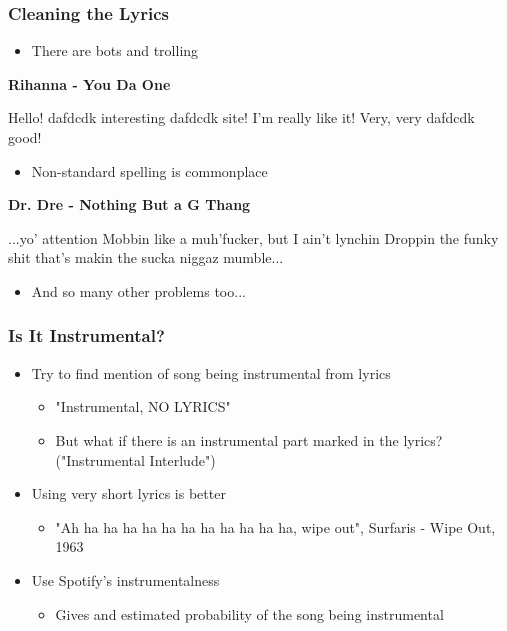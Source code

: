 \documentclass[10pt]{beamer}
\begin{document}
\begin{frame}
\frametitle{Cleaning the Lyrics}

\begin{itemize}
    \item There are bots and trolling
\end{itemize}

\medskip

\textbf{Rihanna - You Da One}

Hello! dafdcdk interesting dafdcdk site! I'm really like it! Very, very dafdcdk good!

\pause

\bigskip

\begin{itemize}
    \item Non-standard spelling is commonplace
\end{itemize}

\medskip

\textbf{Dr. Dre - Nothing But a G Thang}

...yo' attention Mobbin like a muh'fucker, but I ain't lynchin Droppin the funky shit that's makin the sucka niggaz mumble...

\bigskip

\pause

\begin{itemize}
    \item And so many other problems too...
\end{itemize}


\end{frame}

\begin{frame}
\frametitle{Is It Instrumental?}

\begin{itemize}
    \item Try to find mention of song being instrumental from lyrics
        \begin{itemize}
            \item "Instrumental, NO LYRICS"
            \item But what if there is an instrumental part marked in the lyrics? ("Instrumental Interlude")
        \end{itemize}
    \pause
    \item Using very short lyrics is better
    \begin{itemize}
        \item "Ah ha ha ha ha ha ha ha ha ha ha ha, wipe out", Surfaris - Wipe Out, 1963
    \pause
    \end{itemize}
    \item Use Spotify's instrumentalness
    \begin{itemize}
        \item Gives and estimated probability of the song being instrumental
    \end{itemize}
\end{itemize}


\end{frame}
\end{document}
